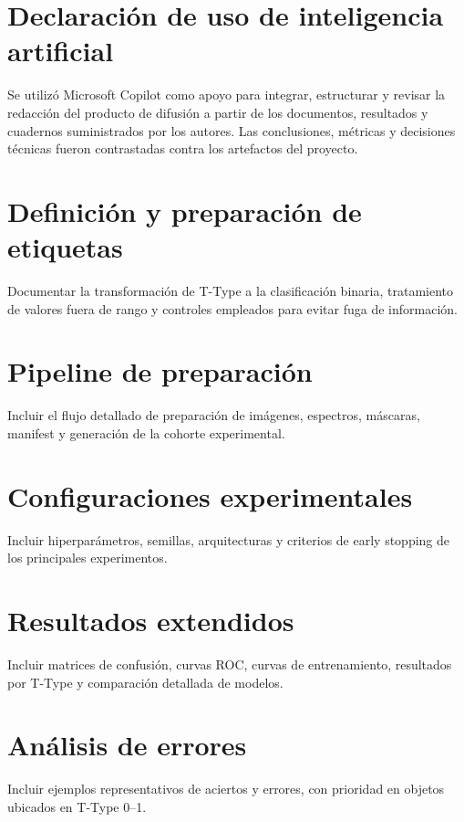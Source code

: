 \documentclass[letterpaper,11pt]{article}
\begin{document}
\section*{Declaración de uso de inteligencia artificial} 

Se utilizó Microsoft Copilot como apoyo para integrar, estructurar y revisar la redacción del producto de difusión a partir de los documentos, resultados y cuadernos suministrados por los autores. Las conclusiones, métricas y decisiones técnicas fueron contrastadas contra los artefactos del proyecto. 

\printbibliography[title={Referencias}]

\clearpage 
\appendix

\section{Definición y preparación de etiquetas} 

Documentar la transformación de T-Type a la clasificación binaria, tratamiento de valores fuera de rango y controles empleados para evitar fuga de información. 

\section{Pipeline de preparación} 

Incluir el flujo detallado de preparación de imágenes, espectros, máscaras, manifest y generación de la cohorte experimental.

\section{Configuraciones experimentales} 

Incluir hiperparámetros, semillas, arquitecturas y criterios de early stopping de los principales experimentos. 

\section{Resultados extendidos} 

Incluir matrices de confusión, curvas ROC, curvas de entrenamiento, resultados por T-Type y comparación detallada de modelos. 

\section{Análisis de errores} 

Incluir ejemplos representativos de aciertos y errores, con prioridad en objetos ubicados en T-Type 0--1.
\end{document}
